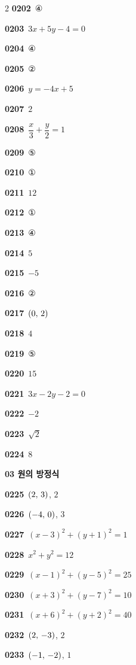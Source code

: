 \documentclass[10pt,a4paper]{article}
\begin{document}
\begin{multicols}{2}
\noindent\textbf{0202}\ ④\par
\noindent\textbf{0203}\ $3x+5y-4=0$\par
\noindent\textbf{0204}\ ④\par
\noindent\textbf{0205}\ ②\par
\noindent\textbf{0206}\ $y=-4x+5$\par
\noindent\textbf{0207}\ $2$\par
\noindent\textbf{0208}\ $\dfrac{x}{3}+\dfrac{y}{2}=1$\par
\noindent\textbf{0209}\ ⑤\par
\noindent\textbf{0210}\ ①\par
\noindent\textbf{0211}\ $12$\par
\noindent\textbf{0212}\ ①\par
\noindent\textbf{0213}\ ④\par
\noindent\textbf{0214}\ $5$\par
\noindent\textbf{0215}\ $-5$\par
\noindent\textbf{0216}\ ②\par
\noindent\textbf{0217}\ $(0,\mkern3mu 2)$\par
\noindent\textbf{0218}\ $4$\par
\noindent\textbf{0219}\ ⑤\par
\noindent\textbf{0220}\ $15$\par
\noindent\textbf{0221}\ $3x-2y-2=0$\par
\noindent\textbf{0222}\ $-2$\par
\noindent\textbf{0223}\ $\sqrt{2}$\par
\noindent\textbf{0224}\ $8$\par
\noindent\textbf{03 원의 방정식}\par\smallskip
\noindent\textbf{0225}\ $(2,\mkern3mu 3)$, $2$\par
\noindent\textbf{0226}\ $(-4,\mkern3mu 0)$, $3$\par
\noindent\textbf{0227}\ $(x-3)^2+(y+1)^2=1$\par
\noindent\textbf{0228}\ $x^2+y^2=12$\par
\noindent\textbf{0229}\ $(x-1)^2+(y-5)^2=25$\par
\noindent\textbf{0230}\ $(x+3)^2+(y-7)^2=10$\par
\noindent\textbf{0231}\ $(x+6)^2+(y+2)^2=40$\par
\noindent\textbf{0232}\ $(2,\mkern3mu -3)$, $2$\par
\noindent\textbf{0233}\ $(-1,\mkern3mu -2)$, $1$\par

\end{multicols}
\end{document}

